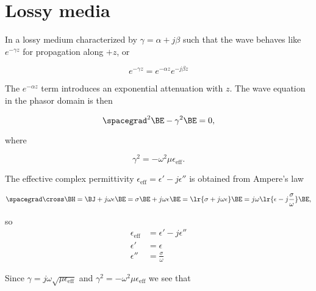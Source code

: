 %
%
\section{Lossy media}

In a lossy medium characterized by \( \gamma = \alpha + j \beta \) such that the wave behaves like \( e^{-\gamma z } \) for propagation along \( +z \), or

\begin{equation}\label{eqn:uwavesLecture3:20}
e^{-\gamma z} = e^{-\alpha z} e^{-j \beta z}
\end{equation}

The \( e^{-\alpha z} \) term introduces an exponential attenuation with \( z \).  The wave equation in the phasor domain is then

\begin{equation}\label{eqn:uwavesLecture3:40}
\spacegrad^2 \BE - \gamma^2 \BE = 0,
\end{equation}

where

\begin{equation}\label{eqn:uwavesLecture3:60}
\gamma^2 = - \omega^2 \mu \epsilon_{\mathrm{eff}}.
\end{equation}

The effective complex permittivity \( \epsilon_{\mathrm{eff}} = \epsilon' -j \epsilon'' \) is obtained from Ampere's law

\begin{dmath}\label{eqn:uwavesLecture3:80}
\spacegrad \cross \BH
= \BJ + j \omega \epsilon \BE
= \sigma \BE + j \omega \epsilon \BE
= \lr{ \sigma + j \omega \epsilon } \BE
= j \omega \lr{ \epsilon -j \frac{\sigma}{\omega} } \BE ,
\end{dmath}

so
\begin{equation}\label{eqn:uwavesLecture3:100}
\begin{aligned}
\epsilon_{\mathrm{eff}} &= \epsilon' -j \epsilon'' \\
\epsilon' &= \epsilon \\
\epsilon'' &= \frac{\sigma}{\omega}
\end{aligned}
\end{equation}

Since \( \gamma = j \omega \sqrt{ \mu \epsilon_{\mathrm{eff}} } \) and \( \gamma^2 = -\omega^2 \mu \epsilon_{\mathrm{eff}} \) we see that

